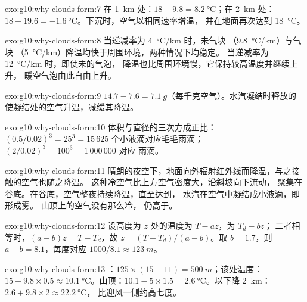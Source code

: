 \begin{solution}{exo:g10:why-clouds-form:7}
在 \qty{1}{km} 处：$18 - 9.8 = \qty{8.2}{\degreeCelsius}$；在 \qty{2}{km} 处：
$18 - 19.6 = \qty{-1.6}{\degreeCelsius}$。下沉时，空气以相同速率增温，
并在地面再次达到 \qty{18}{\degreeCelsius}。
\end{solution}

\begin{solution}{exo:g10:why-clouds-form:8}
当递减率为 \qty{4}{\degreeCelsius/km} 时，未气块
（\qty{9.8}{\degreeCelsius/km}）与气块
（\qty{5}{\degreeCelsius/km}）降温均快于周围环境，两种情况下均稳定。
当递减率为 \qty{12}{\degreeCelsius/km} 时，即使未的气泡，
降温也比周围环境慢，它保持较高温度并继续上升，
暖空气泡由此自由上升。
\end{solution}

\begin{solution}{exo:g10:why-clouds-form:9}
$14.7 - 7.6 = \qty{7.1}{g}$（每千克空气）。水汽凝结时释放的
使凝结处的空气升温，减缓其降温。
\end{solution}

\begin{solution}{exo:g10:why-clouds-form:10}
体积与直径的三次方成正比：$(0.5/0.02)^3 = 25^3 = 15\,625$
个小液滴对应毛毛雨滴；$(2/0.02)^3 = 100^3 = 1\,000\,000$ 对应
雨滴。
\end{solution}

\begin{solution}{exo:g10:why-clouds-form:11}
晴朗的夜空下，地面向外辐射红外线而降温，与之接触的空气也随之降温。
这种冷空气比上方空气密度大，沿斜坡向下流动，
聚集在谷底。在谷底，空气整夜持续降温，直至达到，
水汽在空气中凝结成小液滴，即形成雾。
山顶上的空气没有那么冷，
仍高于。
\end{solution}

\begin{solution}{exo:g10:why-clouds-form:12}
设高度为 $z$ 处的温度为 $T - a z$，为 $T_d - b z$；
二者相等时，$(a - b) z = T - T_d$，故 $z = (T - T_d)/(a - b)$。取
$b = 1.7$，则 $a - b = 8.1$，每度对应 $1000/8.1 \approx \qty{123}{m}$。
\end{solution}

\begin{solution}{exo:g10:why-clouds-form:13}
：$125 \times (15 - 11) = \qty{500}{m}$；该处温度：
$15 - 9.8 \times 0.5 \approx \qty{10.1}{\degreeCelsius}$。山顶：$10.1 - 5
\times 1.5 = \qty{2.6}{\degreeCelsius}$。以下降 \qty{2}{km}：
$2.6 + 9.8 \times 2 \approx \qty{22.2}{\degreeCelsius}$，
比迎风一侧约高七度。
\end{solution}

